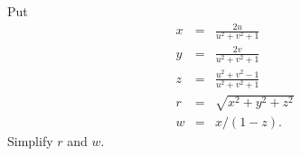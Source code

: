 \documentclass[a4paper,10pt]{amsbook}
\begin{document}
\begin{exercise}\label{ex-stereo}
 Put
 \begin{eqnarray*}
   x &=& \frac{2u}{u^2+v^2+1} \\
   y &=& \frac{2v}{u^2+v^2+1} \\
   z &=& \frac{u^2+v^2-1}{u^2+v^2+1} \\
   r &=& \sqrt{x^2+y^2+z^2} \\
   w &=& x/(1-z).
 \end{eqnarray*}
 Simplify $r$ and $w$.
\end{exercise}
\end{document}
